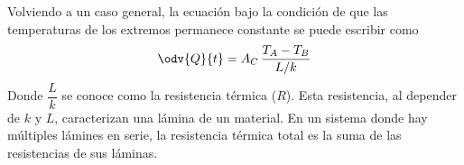 Volviendo a un caso general, la ecuación bajo la condición de que las
temperaturas de los extremos permanece constante se puede escribir como
\[\odv{Q}{t} = A_C\,\frac{T_A - T_B}{L/k}\]
Donde $\dfrac{L}{k}$ se conoce como la resistencia térmica ($R$). Esta
resistencia, al depender de $k$ y $L$, caracterizan una lámina de un
material. En un sistema donde hay múltiples lámines en serie, la
resistencia térmica total es la suma de las resistencias de sus láminas.